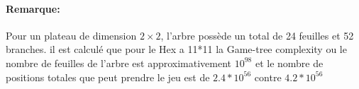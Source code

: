 \paragraph{Remarque:}
Pour un plateau de dimension $2\times2$, l'arbre possède un total de 24 feuilles et 52 branches.
il est calculé que pour le Hex a 11*11 la Game-tree complexity ou le nombre de feuilles de l'arbre est
approximativement $10^{98}$ et le nombre de positions totales que peut prendre le jeu est de $2.4*10^{56}$ contre
$4.2*10^{56}$
